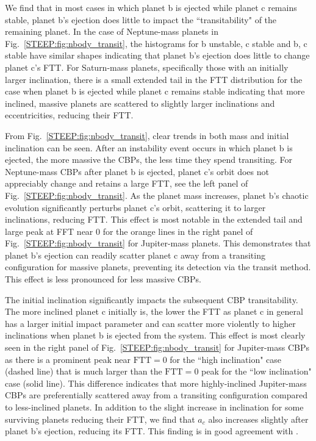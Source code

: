 We find that in most cases in which planet b is ejected while planet c remains stable, planet b's ejection does little to impact the ``transitability" of the remaining planet.  In the case of Neptune-mass planets in Fig.~\ref{STEEP:fig:nbody_transit}, the histograms for b unstable, c stable and b, c stable have similar shapes indicating that planet b's ejection does little to change planet c's FTT.  For Saturn-mass planets, specifically those with an initially larger inclination, there is a small extended tail in the FTT distribution for the case when planet b is ejected while planet c remains stable indicating that more inclined, massive planets are scattered to slightly larger inclinations and eccentricities, reducing their FTT.  

From Fig.~\ref{STEEP:fig:nbody_transit}, clear trends in both mass and initial inclination can be seen.  After an instability event occurs in which planet b is ejected, the more massive the CBPs, the less time they spend transiting.  For Neptune-mass CBPs after planet b is ejected, planet c's orbit does not appreciably change and retains a large FTT, see the left panel of Fig.~\ref{STEEP:fig:nbody_transit}.  As the planet mass increases, planet b's chaotic evolution significantly perturbs planet c's orbit, scattering it to larger inclinations, reducing FTT.  This effect is most notable in the extended tail and large peak at FFT near 0 for the orange lines in the right panel of Fig.~\ref{STEEP:fig:nbody_transit} for Jupiter-mass planets.  This demonstrates that planet b's ejection can readily scatter planet c away from a transiting configuration for massive planets, preventing its detection via the transit method.  This effect is less pronounced for less massive CBPs.

The initial inclination significantly impacts the subsequent CBP transitability.  The more inclined planet c initially is, the lower the FTT as planet c in general has a larger initial impact parameter and can scatter more violently to higher inclinations when planet b is ejected from the system.  This effect is most clearly seen in the right panel of Fig.~\ref{STEEP:fig:nbody_transit} for Jupiter-mass CBPs as there is a prominent peak near $\text{FTT}= 0$ for the ``high inclination" case (dashed line) that is much larger than the $\text{FTT}=0$ peak for the ``low inclination" case (solid line).  This difference indicates that more highly-inclined Jupiter-mass CBPs are preferentially scattered away from a transiting configuration compared to less-inclined planets.  In addition to the slight increase in inclination for some surviving planets reducing their FTT, we find that $a_c$ also increases slightly after planet b's ejection, reducing its FTT.  This finding is in good agreement with \citet{Gong2017}.

